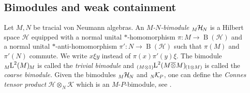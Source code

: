 \documentclass[a4paper,11pt]{amsart}
\numberwithin{equation}{section}
\begin{document}
\subsection{Bimodules and weak containment}\label{subsec.bimod}

Let $M,N$ be tracial von Neumann algebras. An \emph{$M$-$N$-bimodule ${\mathord{\raisebox{-0.4ex}[0ex][0ex]{\scriptsize ${M}$}{{\mathcal{H}}}\hspace{-0.2ex}\raisebox{-0.4ex}[0ex][0ex]{\scriptsize ${N}$}}}$} is a Hilbert space ${\mathcal{H}}$ equipped with a normal unital $*$-homomorphism $\pi: M {\rightarrow} {\operatorname{B}}({\mathcal{H}})$ and a normal unital $*$-anti-homomorphism $\pi':N {\rightarrow} {\operatorname{B}}({\mathcal{H}})$ such that $\pi(M)$ and $\pi'(N)$ commute. We write $x\xi y$ instead of $\pi(x) \pi'(y) \xi$.
The bimodule ${\mathord{\raisebox{-0.4ex}[0ex][0ex]{\scriptsize ${M}$}{{{\mathord{\text{\rm L}}}^2(M)}}\hspace{-0.2ex}\raisebox{-0.4ex}[0ex][0ex]{\scriptsize ${M}$}}}$ is called the \emph{trivial bimodule} and ${\mathord{\raisebox{-0.4ex}[0ex][0ex]{\scriptsize ${(M {\otimes} 1)}$}{{{\mathord{\text{\rm L}}}^2(M {\mathbin{\overline{\otimes}}} M)}}\hspace{-0.2ex}\raisebox{-0.4ex}[0ex][0ex]{\scriptsize ${(1 {\otimes} M)}$}}}$ is called the \emph{coarse bimodule.}
Given the bimodules ${\mathord{\raisebox{-0.4ex}[0ex][0ex]{\scriptsize ${M}$}{{\mathcal{H}}}\hspace{-0.2ex}\raisebox{-0.4ex}[0ex][0ex]{\scriptsize ${N}$}}}$ and ${\mathord{\raisebox{-0.4ex}[0ex][0ex]{\scriptsize ${N}$}{\mathcal{K}}\hspace{-0.2ex}\raisebox{-0.4ex}[0ex][0ex]{\scriptsize ${P}$}}}$, one can define the \emph{Connes tensor product} ${\mathcal{H}} {\otimes}_N {\mathcal{K}}$ which is an $M$-$P$-bimodule, see \cite[V.Appendix B]{Co94}.
\end{document}

